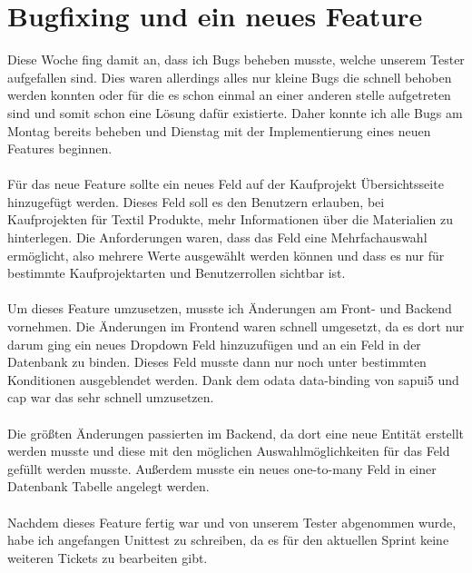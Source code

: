 \section{Bugfixing und ein neues Feature}
Diese Woche fing damit an, dass ich Bugs beheben musste, welche unserem Tester aufgefallen sind. Dies waren allerdings alles nur kleine Bugs die schnell behoben werden konnten oder für die es schon einmal an einer anderen stelle aufgetreten sind und somit schon eine Lösung dafür existierte. Daher konnte ich alle Bugs am Montag bereits beheben und Dienstag mit der Implementierung eines neuen Features beginnen. \\\\
Für das neue Feature sollte ein neues Feld auf der Kaufprojekt Übersichtsseite hinzugefügt werden. Dieses Feld soll es den Benutzern erlauben, bei Kaufprojekten für Textil Produkte, mehr Informationen über die Materialien zu hinterlegen. Die Anforderungen waren, dass das Feld eine Mehrfachauswahl ermöglicht, also mehrere Werte ausgewählt werden können und dass es nur für bestimmte Kaufprojektarten und Benutzerrollen sichtbar ist. \\\\
Um dieses Feature umzusetzen, musste ich Änderungen am Front- und Backend vornehmen. Die Änderungen im Frontend waren schnell umgesetzt, da es dort nur darum ging ein neues Dropdown Feld hinzuzufügen und an ein Feld in der Datenbank zu binden. Dieses Feld musste dann nur noch unter bestimmten Konditionen ausgeblendet werden. Dank dem \gls{odata} data-binding von \gls{sapui5} und \gls{cap} war das sehr schnell umzusetzen. \\\\
Die größten Änderungen passierten im Backend, da dort eine neue Entität erstellt werden musste und diese mit den möglichen Auswahlmöglichkeiten für das Feld gefüllt werden musste. Außerdem musste ein neues one-to-many Feld in einer Datenbank Tabelle angelegt werden. \\\\
Nachdem dieses Feature fertig war und von unserem Tester abgenommen wurde, habe ich angefangen Unittest zu schreiben, da es für den aktuellen Sprint keine weiteren Tickets zu bearbeiten gibt. \\\\

